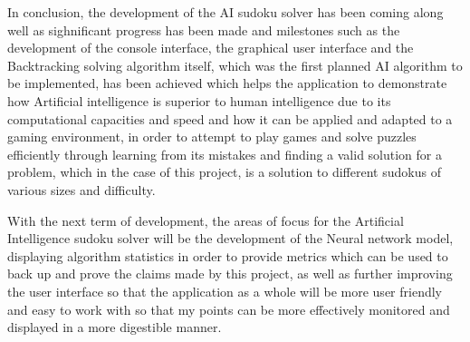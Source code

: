 \documentclass[]{final_report}
\begin{document}
In conclusion, the development of the AI sudoku solver has been coming along well as sighnificant progress has been made and milestones such as the development of the console interface, the graphical user interface and the Backtracking solving algorithm itself, which was the first planned AI algorithm to be implemented, has been achieved which helps the application to demonstrate how Artificial intelligence is superior to human intelligence due to its computational capacities and speed and how it can be applied and adapted to a gaming environment, in order to attempt to play games and solve puzzles efficiently through learning from its mistakes and finding a valid solution for a problem, which in the case of this project, is a solution to different sudokus of various sizes and difficulty. 

With the next term of development, the areas of focus for the Artificial Intelligence sudoku solver will be the development of the Neural network model, displaying algorithm statistics in order to provide metrics which can be used to back up and prove the claims made by this project, as well as further improving the user interface so that the application as a whole will be more user friendly and easy to work with so that my points can be more effectively monitored  and displayed in a more digestible manner. 
\end{document}
